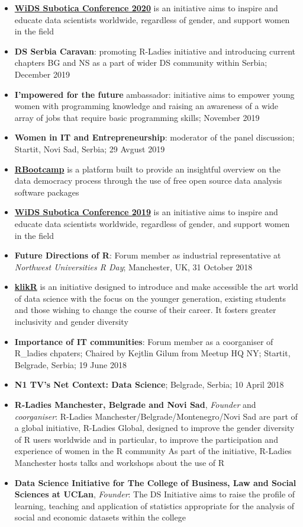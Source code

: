 \documentclass[
]{article}
\providecommand{\tightlist}{%
  \setlength{\itemsep}{0pt}\setlength{\parskip}{0pt}}
\begin{document}
\begin{itemize}
\tightlist
\item
  \href{https://suwids2.netlify.app}{\textbf{WiDS Subotica Conference
  2020}} is an initiative aims to inspire and educate data scientists
  worldwide, regardless of gender, and support women in the field
\item
  \textbf{DS Serbia Caravan}: promoting R-Ladies initiative and
  introducing current chapters BG and NS as a part of wider DS community
  within Serbia; December 2019
\item
  \textbf{I'mpowered for the future} ambassador: initiative aims to
  empower young women with programming knowledge and raising an
  awareness of a wide array of jobs that require basic programming
  skills; November 2019
\item
  \textbf{Women in IT and Entrepreneurship}: moderator of the panel
  discussion; Startit, Novi Sad, Serbia; 29 Avgust 2019
\item
  \href{http://rbootcamp.rbind.io}{\textbf{RBootcamp}} is a platform
  built to provide an insightful overview on the data democracy process
  through the use of free open source data analysis software packages
\item
  \href{https://widssubotica.netlify.com}{\textbf{WiDS Subotica
  Conference 2019}} is an initiative aims to inspire and educate data
  scientists worldwide, regardless of gender, and support women in the
  field
\item
  \textbf{Future Directions of R}: Forum member as industrial
  representative at \emph{Northwest Universities R Day}; Manchester, UK,
  31 October 2018
\item
  \href{http://klikr.rbind.io}{\textbf{klikR}} is an initiative designed
  to introduce and make accessible the art world of data science with
  the focus on the younger generation, existing students and those
  wishing to change the course of their career. It fosters greater
  inclusivity and gender diversity
\item
  \textbf{Importance of IT communities}: Forum member as a coorganiser
  of R\_ladies chpaters; Chaired by Kejtlin Gilum from Meetup HQ NY;
  Startit, Belgrade, Serbia; 19 June 2018
\item
  \textbf{N1 TV's Net Context: Data Science}; Belgrade, Serbia; 10 April
  2018
\item
  \textbf{R-Ladies Manchester, Belgrade and Novi Sad}, \emph{Founder}
  and \emph{coorganiser}: R-Ladies Manchester/Belgrade/Montenegro/Novi
  Sad are part of a global initiative, R-Ladies Global, designed to
  improve the gender diversity of R users worldwide and in particular,
  to improve the participation and experience of women in the R
  community As part of the initiative, R-Ladies Manchester hosts talks
  and workshops about the use of R
\item
  \textbf{Data Science Initiative for The College of Business, Law and
  Social Sciences at UCLan}, \emph{Founder}: The DS Initiative aims to
  raise the profile of learning, teaching and application of statistics
  appropriate for the analysis of social and economic datasets within
  the college
\end{itemize}
\end{document}
